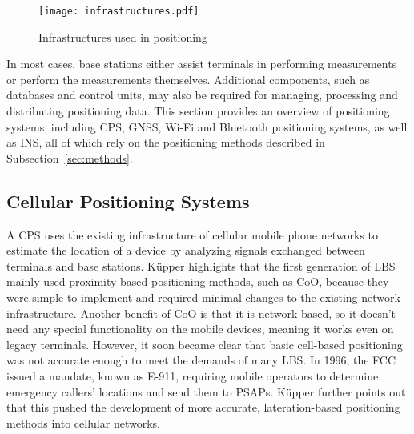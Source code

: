 \begin{figure}[htbp] 
    \centering 
    \texttt{[image: infrastructures.pdf]} 
    \caption{Infrastructures used in positioning \cite{kupper2005location}} 
    \label{fig:infrastructures} 
\end{figure}

In most cases, base stations either assist terminals in performing measurements or perform the measurements themselves. 
Additional components, such as databases and control units, may also be required for managing, processing and distributing positioning data. 
This section provides an overview of positioning systems, including \ac{CPS}, \acs{GNSS}, \acs{Wi-Fi} and Bluetooth positioning systems, as well as \acs{INS}, all of which rely on the positioning methods described in Subsection~\ref{sec:methods}.



\subsection{Cellular Positioning Systems}
A \acs{CPS} uses the existing infrastructure of cellular mobile phone networks to estimate the location of a device by analyzing signals exchanged between terminals and base stations.
K\"upper \cite{kupper2005location} highlights that the first generation of \ac{LBS} mainly used proximity-based positioning methods, such as \acs{CoO}, because they were simple to implement and required minimal changes to the existing network infrastructure.
Another benefit of \acs{CoO} is that it is network-based, so it doesn't need any special functionality on the mobile devices, meaning it works even on legacy terminals.
However, it soon became clear that basic cell-based positioning was not accurate enough to meet the demands of many \acs{LBS}.
In 1996, the \ac{FCC} issued a mandate, known as \ac{E-911}, requiring mobile operators to determine emergency callers' locations and send them to \ac{PSAPs}.
K\"upper \cite{kupper2005location} further points out that this pushed the development of more accurate, lateration-based positioning methods into cellular networks.

